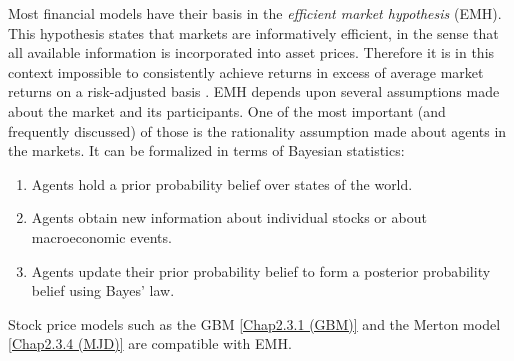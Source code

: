 Most financial models have their basis in the \textit{efficient market hypothesis} (EMH).
This hypothesis states that markets are informatively efficient, in the sense that all available information is incorporated into asset prices.
Therefore it is in this context impossible to consistently achieve returns in excess of average market returns on a risk-adjusted basis \citep[Chapter 13, p.~317]{brealey2012principles}.
EMH depends upon several assumptions made about the market and its participants. 
One of the most important (and frequently discussed) of those is the rationality assumption made about agents in the markets.
It can be formalized in terms of Bayesian statistics:
\begin{enumerate}
	\item Agents hold a prior probability belief over states of the world.
	\item Agents obtain new information about individual stocks or about macroeconomic events.
	\item Agents update their prior probability belief to form a posterior probability belief using Bayes' law.
\end{enumerate}
Stock price models such as the GBM \eqref{Chap2.3.1 (GBM)} and the Merton model \eqref{Chap2.3.4 (MJD)} are compatible with EMH.

